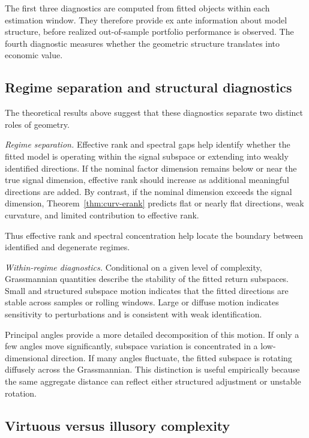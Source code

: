 \documentclass[11pt,letterpaper]{article}
\begin{document}
The first three diagnostics are computed from fitted objects within each estimation window. They therefore provide ex ante information about model structure, before realized out-of-sample portfolio performance is observed. The fourth diagnostic measures whether the geometric structure translates into economic value.

\subsection{Regime separation and structural diagnostics}
\label{subsec:regime-separation}

The theoretical results above suggest that these diagnostics separate two distinct roles of geometry.

\smallskip\noindent
\textit{Regime separation.}
Effective rank and spectral gaps help identify whether the fitted model is operating within the signal subspace or extending into weakly identified directions. If the nominal factor dimension remains below or near the true signal dimension, effective rank should increase as additional meaningful directions are added. By contrast, if the nominal dimension exceeds the signal dimension, Theorem~\ref{thm:curv-erank} predicts flat or nearly flat directions, weak curvature, and limited contribution to effective rank.

Thus effective rank and spectral concentration help locate the boundary between identified and degenerate regimes.

\smallskip\noindent
\textit{Within-regime diagnostics.} Conditional on a given level of complexity, Grassmannian quantities describe the stability of the fitted return subspaces. Small and structured subspace motion indicates that the fitted directions are stable across samples or rolling windows. Large or diffuse motion indicates sensitivity to perturbations and is consistent with weak identification.

Principal angles provide a more detailed decomposition of this motion. If only a few angles move significantly, subspace variation is concentrated in a low-dimensional direction. If many angles fluctuate, the fitted subspace is rotating diffusely across the Grassmannian. This distinction is useful empirically because the same aggregate distance can reflect either structured adjustment or unstable rotation.

\subsection{Virtuous versus illusory complexity}
\label{subsec:virtuous-illusory-complexity}
\end{document}
